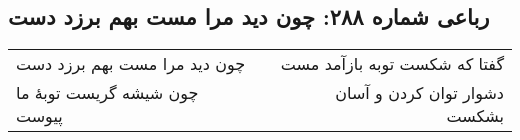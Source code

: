 \begin{center}
\section*{رباعی شماره ۲۸۸: چون دید مرا مست بهم برزد دست}
\label{sec:0288}
\begin{longtable}{l p{0.5cm} r}
چون دید مرا مست بهم برزد دست
&&
گفتا که شکست توبه بازآمد مست
\\
چون شیشه گریست توبهٔ ما پیوست
&&
دشوار توان کردن و آسان بشکست
\\
\end{longtable}
\end{center}
